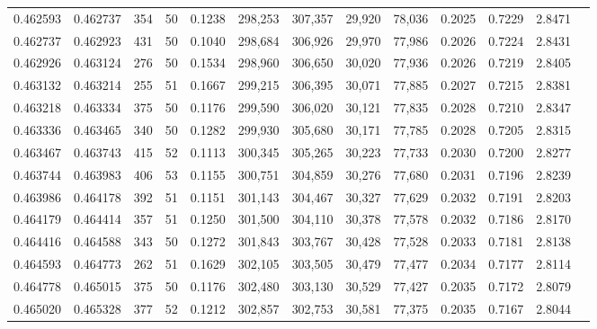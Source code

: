 \begin{tabular}{rrrrrrrrrrrrr}
0.462593 & 0.462737 &   354 &  50 &                                     0.1238 & 298,253 & 307,357 &  29,920 &  78,036 & 0.2025 & 0.7229 & 2.8471 \\
0.462737 & 0.462923 &   431 &  50 &                                     0.1040 & 298,684 & 306,926 &  29,970 &  77,986 & 0.2026 & 0.7224 & 2.8431 \\
0.462926 & 0.463124 &   276 &  50 &                                     0.1534 & 298,960 & 306,650 &  30,020 &  77,936 & 0.2026 & 0.7219 & 2.8405 \\
0.463132 & 0.463214 &   255 &  51 &                                     0.1667 & 299,215 & 306,395 &  30,071 &  77,885 & 0.2027 & 0.7215 & 2.8381 \\
0.463218 & 0.463334 &   375 &  50 &                                     0.1176 & 299,590 & 306,020 &  30,121 &  77,835 & 0.2028 & 0.7210 & 2.8347 \\
0.463336 & 0.463465 &   340 &  50 &                                     0.1282 & 299,930 & 305,680 &  30,171 &  77,785 & 0.2028 & 0.7205 & 2.8315 \\
0.463467 & 0.463743 &   415 &  52 &                                     0.1113 & 300,345 & 305,265 &  30,223 &  77,733 & 0.2030 & 0.7200 & 2.8277 \\
0.463744 & 0.463983 &   406 &  53 &                                     0.1155 & 300,751 & 304,859 &  30,276 &  77,680 & 0.2031 & 0.7196 & 2.8239 \\
0.463986 & 0.464178 &   392 &  51 &                                     0.1151 & 301,143 & 304,467 &  30,327 &  77,629 & 0.2032 & 0.7191 & 2.8203 \\
0.464179 & 0.464414 &   357 &  51 &                                     0.1250 & 301,500 & 304,110 &  30,378 &  77,578 & 0.2032 & 0.7186 & 2.8170 \\
0.464416 & 0.464588 &   343 &  50 &                                     0.1272 & 301,843 & 303,767 &  30,428 &  77,528 & 0.2033 & 0.7181 & 2.8138 \\
0.464593 & 0.464773 &   262 &  51 &                                     0.1629 & 302,105 & 303,505 &  30,479 &  77,477 & 0.2034 & 0.7177 & 2.8114 \\
0.464778 & 0.465015 &   375 &  50 &                                     0.1176 & 302,480 & 303,130 &  30,529 &  77,427 & 0.2035 & 0.7172 & 2.8079 \\
0.465020 & 0.465328 &   377 &  52 &                                     0.1212 & 302,857 & 302,753 &  30,581 &  77,375 & 0.2035 & 0.7167 & 2.8044 \\

\end{tabular}
